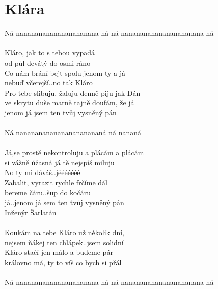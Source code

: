 \section{Klára}
Ná nanananananananananana ná ná nanananananananananana ná\\
\\
Kláro, jak to s tebou vypadá\\
od půl devátý do osmi ráno\\
Co nám brání bejt spolu jenom ty a já\\
nebuď včerejší..no tak Kláro\\
Pro tebe slibuju, žaluju denně piju jak Dán\\
ve skrytu duše marně tajně doufám, že já\\
jenom já jsem ten tvůj vysněný pán\\
\\
Ná nanananananananananananá ná nananá\\
\\
Já,se prostě nekontroluju
a plácám a plácám\\
si vážně úžasná já tě nejspíš miluju\\
No ty mi dáváš..jééééééé\\
Zabalit, vyrazit rychle frčíme dál\\
bereme čáru..šup do kočáru\\
já..jenom já sem ten tvůj vysněný pán\\
Inženýr Šarlatán\\
\\ 
Koukám na tebe Kláro už několik   dní,\\
nejsem ňákej ten chlápek..jsem solidní\\
Kláro stačí jen málo a budeme pár\\
královno má, ty to víš co bych si přál\\
\\
Ná nanananananananananana ná ná  nanananananananananana ná \\
